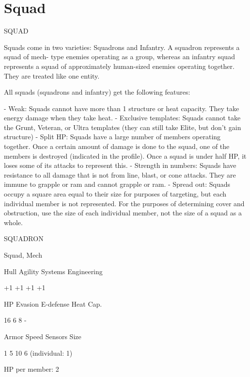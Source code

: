 \section{Squad}

                                                 SQUAD   

Squads come in two varieties: Squadrons and Infantry. A squadron represents a squad of mech- 
type enemies operating as a group, whereas an infantry squad represents a squad of  
approximately human-sized enemies operating together. They are treated like one entity.
 

All squads (squadrons and infantry) get the following features:
 
    -   Weak: Squads cannot have more than 1 structure or heat capacity. They take energy  
        damage when they take heat.  
    -   Exclusive templates: Squads cannot take the Grunt, Veteran, or Ultra templates (they  
        can still take Elite, but don’t gain structure)  
    -   Split HP: Squads have a large number of members operating together. Once a certain  
        amount of damage is done to the squad, one of the members is destroyed (indicated in  
        the profile). Once a squad is under half HP, it loses some of its attacks to represent this.  
    -   Strength in numbers: Squads have resistance to all damage that is not from line, blast,  
        or cone attacks. They are immune to grapple or ram and cannot grapple or ram.  
    -   Spread out: Squads occupy a square area equal to their size for purposes of targeting,  
        but each individual member is not represented. For the purposes of determining cover  
        and obstruction, use the size of each individual member, not the size of a squad as a  
        whole.  

       SQUADRON 

       Squad, Mech 

       Hull       Agility     Systems       Engineering 

       +1         +1          +1            +1 

       HP         Evasion     E-defense     Heat Cap. 

       16         6           8             - 

       Armor      Speed       Sensors       Size 

       1          5           10            6 (individual:  
                                            1) 

HP per member: 2
 
